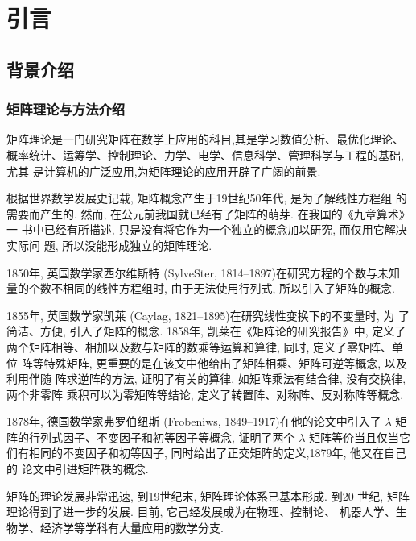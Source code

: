 \section{引言}
\subsection{背景介绍}

\subsubsection{矩阵理论与方法介绍}

\par 矩阵理论是一门研究矩阵在数学上应用的科目,其是学习数值分析、最优化理论、
概率统计、运筹学、控制理论、力学、电学、信息科学、管理科学与工程的基础, 尤其
是计算机的广泛应用,为矩阵理论的应用开辟了广阔的前景.

\par 根据世界数学发展史记载, 矩阵概念产生于19世纪50年代, 是为了解线性方程组
的需要而产生的. 然而, 在公元前我国就已经有了矩阵的萌芽. 在我国的《九章算术》一
书中已经有所描述, 只是没有将它作为一个独立的概念加以研究, 而仅用它解决实际问
题, 所以没能形成独立的矩阵理论.

\par 1850年, 英国数学家西尔维斯特 (SylveSter, 1814--1897)在研究方程的个数与未知
量的个数不相同的线性方程组时, 由于无法使用行列式, 所以引入了矩阵的概念.

\par 1855年, 英国数学家凯莱 (Caylag, 1821--1895)在研究线性变换下的不变量时, 为
了简洁、方便, 引入了矩阵的概念. 1858年, 凯莱在《矩阵论的研究报告》中, 定义了
两个矩阵相等、相加以及数与矩阵的数乘等运算和算律, 同时, 定义了零矩阵、单位
阵等特殊矩阵, 更重要的是在该文中他给出了矩阵相乘、矩阵可逆等概念, 以及利用伴随
阵求逆阵的方法, 证明了有关的算律, 如矩阵乘法有结合律, 没有交换律, 两个非零阵
乘积可以为零矩阵等结论, 定义了转置阵、对称阵、反对称阵等概念.

\par 1878年, 德国数学家弗罗伯纽斯 (Frobeniws, 1849--1917)在他的论文中引入了
$\lambda$ 矩阵的行列式因子、不变因子和初等因子等概念, 证明了两个 $\lambda$ 矩阵等价当且仅当它
们有相同的不变因子和初等因子, 同时给出了正交矩阵的定义,1879年, 他又在自己的
论文中引进矩阵秩的概念.

\par 矩阵的理论发展非常迅速, 到19世纪末, 矩阵理论体系已基本形成. 到20
世纪, 矩阵理论得到了进一步的发展. 目前, 它己经发展成为在物理、控制论、
机器人学、生物学、经济学等学科有大量应用的数学分支.


